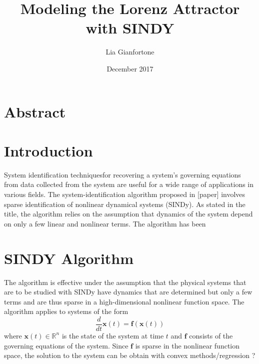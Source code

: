 \documentclass[12pt,preprintnumbers,amsmath,amssymb,titlepage]{report}
\begin{document}
\title{Modeling the Lorenz Attractor with SINDY}
\author{Lia Gianfortone}
\date{December 2017}

\maketitle


\section*{Abstract}

\section*{Introduction}
System identification techniquesfor recovering a system's governing equations from data collected from the system are useful for a wide range of applications in various fields. The system-identification algorithm proposed in [paper] involves sparse identification of nonlinear dynamical systems (SINDy). As stated in the title, the algorithm relies on the assumption that dynamics of the system depend on only a few linear and nonlinear terms. The algorithm has been 


\section*{SINDY Algorithm}
The algorithm is effective under the assumption that the physical systems that are to be studied with SINDy have dynamics that are determined but only a few terms and are thus sparse in a high-dimensional nonlinear function space. The algorithm applies to systems of the form 
\begin{equation}
\frac{d}{dt}\bm{x}(t) = \bm{f}(\bm{x}(t))
\end{equation}
where $\bm{x}(t) \in \mathbb{R}^n$ is the state of the system at time $t$ and $\bm{f}$ consists of the governing equations of the system. Since $\bm{f}$ is sparse in the nonlinear function space, the solution to the system can be obtain with convex methods/regression ?
\end{document}
